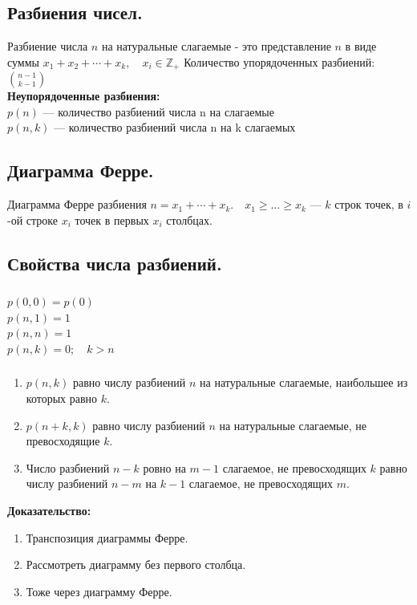 \documentclass[12pt]{article}
\begin{document}
\subsection{Разбиения чисел.}
	Разбиение числа $n$ на натуральные слагаемые - это представление $n$ в виде суммы $x_1 + x_2 +\dotsb + x_k,\quad x_i \in \mathbb{Z_+}$
	Количество упорядоченных разбиений: $\binom{n-1}{k-1}$\\
	\textbf{Неупорядоченные разбиения:}\\
	$p(n)$ — количество разбиений числа n на слагаемые\\
	$p(n,k)$ — количество разбиений числа n на k слагаемых\\

\subsection{Диаграмма Ферре.}
	Диаграмма Ферре разбиения $n = x_1 + \dotsb + x_k. \quad x_1 \geqslant \dotsc \geqslant x_k$ — $k$ строк точек, в $i$-ой строке $x_i$ точек в первых $x_i$ столбцах.

\subsection{Свойства числа разбиений.}
	\subsubsection{}
		$p(0,0) = p(0)$\\
		$p(n,1) = 1$\\
		$p(n,n) = 1$\\
		$p(n,k) = 0; \quad k>n$\\
	\subsubsection{}
		\begin{enumerate}
		\item $p(n,k)$ равно числу разбиений $n$ на натуральные слагаемые, наибольшее из которых равно $k$.
		\item $p(n+k,k)$ равно числу разбиений $n$ на натуральные слагаемые, не превосходящие $k$.
		\item Число разбиений $n-k$ ровно на $m-1$ слагаемое, не превосходящих $k$ равно числу разбиений $n-m$ на $k-1$ слагаемое, не превосходящих $m$.
		\end{enumerate}
		\textbf{Доказательство:}\\
		\begin{enumerate}
			\item Транспозиция диаграммы Ферре.
			\item Рассмотреть диаграмму без первого столбца.
			\item Тоже через диаграмму Ферре.
		\end{enumerate}
		\qedsymbol
\end{document}
